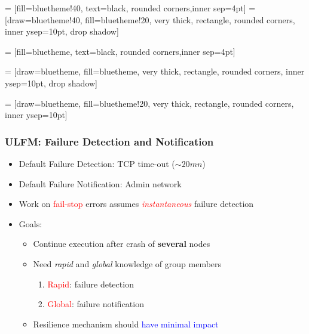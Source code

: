 \newcommand{\probaSymbol}{\mathbb P}
\newcommand{\proba}[1]{\probaSymbol\left(#1\right)}


\usetikzlibrary{shadows,patterns,shapes}

 = [fill=bluetheme!40, text=black, rounded corners,inner sep=4pt] 
 = [draw=bluetheme!40, fill=bluetheme!20, very thick, rectangle, rounded corners, inner ysep=10pt, drop shadow]

 = [fill=bluetheme, text=black, rounded corners,inner sep=4pt] 

 = [draw=bluetheme, fill=bluetheme, very thick, rectangle, rounded corners, inner ysep=10pt, drop shadow]

 = [draw=bluetheme, fill=bluetheme!20, very thick, rectangle, rounded corners, inner ysep=10pt]


\begin{frame}
  \frametitle{ULFM: Failure Detection and Notification}
  \begin{itemize}
  \item Default Failure Detection: TCP time-out ($\sim 20mn$)
  \item Default Failure Notification: Admin network
  \item Work on \textcolor{red}{fail-stop} errors assumes  \textcolor{red}{\emph{instantaneous}} failure detection
  \item Goals:
    \begin{itemize}
    \item Continue execution after crash of \textbf{several} nodes
    \item Need \emph{rapid} and \emph{global} knowledge of group members
      \begin{enumerate}
      \item \textcolor{red}{Rapid}: failure detection
      \item \textcolor{red}{Global}: failure notification
      \end{enumerate}
    \item Resilience mechanism should \textcolor{blue}{have minimal impact}
    \end{itemize}
  \end{itemize}
\end{frame}

